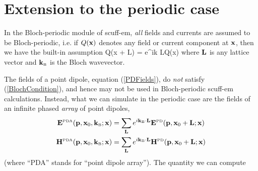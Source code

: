 \documentclass[letterpaper]{article}
\begin{document}
\newpage
\section{Extension to the periodic case}

In the Bloch-periodic module of {\sc scuff-em}, \textit{all}
fields and currents are assumed to be Bloch-periodic, i.e.
if $Q(\mathbf{x})$ denotes any field or current component at $\mathbf{x}$,
then we have the built-in assumption
{Q(\vb x + \vb L) = e^{i\vb k \cdot \vb L}Q(\vb x)}
where $\mathbf{L}$ is any lattice vector and 
$\mathbf{k}_{\hbox{\tiny{B}}}$ is the Bloch wavevector.

The fields of a point dipole, equation (\ref{PDFields}), do \textit{not}
satisfy (\ref{BlochCondition}), and hence may not be used in
Bloch-periodic {\sc scuff-em} calculations. Instead, what we can 
simulate in the periodic case are the fields of an infinite
phased \textit{array} of point dipoles,
\begin{subequations}
\begin{align*}
 \mathbf{E}^{\hbox{\tiny{PDA}}}(\mathbf{p}, \mathbf{x}_0, \mathbf{k}_{\hbox{\tiny{B}}}; \mathbf{x})
&=\sum_{\mathbf{L}} e^{i\mathbf{k}_{\hbox{\tiny{B}}}\cdot \mathbf{L}}
  \mathbf{E}^{\hbox{\tiny{PD}}}(\mathbf{p}, \mathbf{x}_0 + \mathbf{L}; \mathbf{x})
\\
 \mathbf{H}^{\hbox{\tiny{PDA}}}(\mathbf{p}, \mathbf{x}_0, \mathbf{k}_{\hbox{\tiny{B}}}; \mathbf{x})
&=\sum_{\mathbf{L}} e^{i\mathbf{k}_{\hbox{\tiny{B}}} \cdot \mathbf{L}}
  \mathbf{H}^{\hbox{\tiny{PD}}}(\mathbf{p}, \mathbf{x}_0  + \mathbf{L}; \mathbf{x})
\end{align*}
\label{EHPDA}
\end{subequations}
(where ``PDA'' stands for ``point dipole array''). The quantity
we can compute
\end{document}
